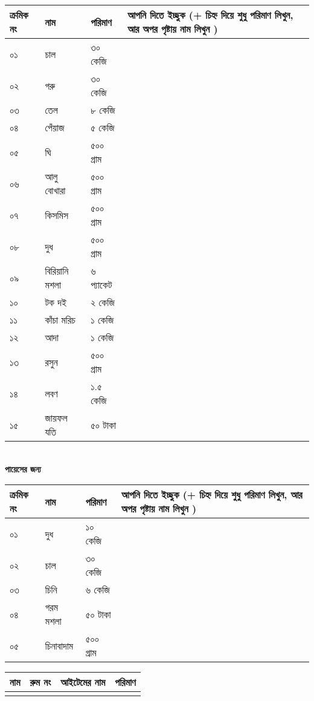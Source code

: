 \documentclass{article}
\newcommand{\aline}{\\\hline \arabic{theyflines} &&&\rule{0cm}{1cm}}
\begin{document}
\begin{center}
\end{center}
\noindent
\begin{tabular}{@{}lll|p{13cm}}
\toprule
ক্রমিক নং &  নাম &  পরিমাণ & আপনি দিতে ইচ্ছুক (+ চিহ্ন দিয়ে শুধু পরিমাণ লিখুন, আর অপর পৃষ্টায় নাম লিখুন )\\
\toprule
০১ & চাল & ৩০ কেজি &\\
\hline
\rule{0cm}{1cm}
\hline
০২ & গরু & ৩০ কেজি &\\
\hline
০৩ & তেল & ৮ কেজি &\\
\hline
০৪ & পেঁয়াজ & ৫ কেজি &\\
\hline
০৫ & ঘি & ৫০০ গ্রাম &\\
\hline
০৬ & আলু বোখারা & ৫০০ গ্রাম &\\
\hline
০৭ & কিসমিস & ৫০০ গ্রাম &\\
\hline
০৮ & দুধ & ৫০০ গ্রাম &\\
\hline
০৯ & বিরিয়ানি মশলা & ৬ প্যাকেট &\\
\hline
১০ & টক দই & ২ কেজি &\\
\hline
১১ & কাঁচা মরিচ & ১ কেজি &\\
\hline
১২ & আদা & ১ কেজি &\\
\hline
১৩ & রসুন & ৫০০ গ্রাম &\\
\hline
১৪ & লবণ & ১.৫ কেজি &\\
\hline
১৫ & জায়ফল যতি & ৫০ টাকা &\\
\bottomrule
\end{tabular}
\\

\textbf{পায়েসের জন্য}\\
\noindent
\begin{tabular}{@{}lll|p{13cm}}
\toprule
ক্রমিক নং &  নাম &  পরিমাণ & আপনি দিতে ইচ্ছুক (+ চিহ্ন দিয়ে শুধু পরিমাণ লিখুন, আর অপর পৃষ্টায় নাম লিখুন )\\
\toprule
০১ & দুধ & ১০ কেজি & \\
\hline
০২ & চাল & ৩০ কেজি & \\
\hline
০৩ & চিনি & ৬ কেজি & \\
\hline
০৪ & গরম মশলা & ৫০ টাকা & \\
\hline
০৫ & চিনাবাদাম & ৫০০ গ্রাম & \\
\bottomrule
\end{tabular}
\newpage
\begin{tabular}{|p{6cm}|p{2cm}|p{3cm}|p{4cm}|}
\toprule
নাম & রুম নং & আইটেমের নাম & পরিমাণ
\forloop{theyflines}{1}{\value{theyflines} < 26}{\aline}\\
\toprule
\end{tabular}
\end{document}
